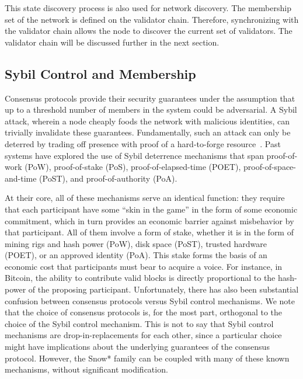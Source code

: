 \documentclass[runningheads]{llncs}
\begin{document}

This state discovery process is also used for network discovery. The membership set of the network is defined on the validator chain. Therefore, synchronizing with the validator chain allows the node to discover the current set of validators. The validator chain will be discussed further in the next section.

\subsection{Sybil Control and Membership}
Consensus protocols provide their security guarantees under the assumption that up to a threshold number of members in the system could be adversarial.
A Sybil attack, wherein a node cheaply foods the network with malicious identities, can trivially invalidate these guarantees. 
Fundamentally, such an attack can only be deterred by trading off presence with proof of a hard-to-forge resource~\cite{douceur2002sybil}. 
Past systems have explored the use of Sybil deterrence mechanisms that span proof-of-work (PoW), proof-of-stake (PoS), proof-of-elapsed-time (POET), proof-of-space-and-time (PoST), and proof-of-authority (PoA).

At their core, all of these mechanisms serve an identical function: they require that each participant have some ``skin in the game'' in the form of some economic commitment, which in turn provides an economic barrier against misbehavior by that participant. 
All of them involve a form of stake, whether it is in the form of mining rigs and hash power (PoW), disk space (PoST), trusted hardware (POET), or an approved identity (PoA). 
This stake forms the basis of an economic cost that participants must bear to acquire a voice. 
For instance, in Bitcoin, the ability to contribute valid blocks is directly proportional to the hash-power of the proposing participant.
Unfortunately, there has also been substantial confusion between consensus protocols versus Sybil control mechanisms.
We note that the choice of consensus protocols is, for the most part, orthogonal to the choice of the Sybil control mechanism. 
This is not to say that Sybil control mechanisms are drop-in-replacements for each other, since a particular choice might have implications about the underlying guarantees of the consensus protocol. 
However, the Snow* family can be coupled with many of these known mechanisms, without significant modification. 
\end{document}
